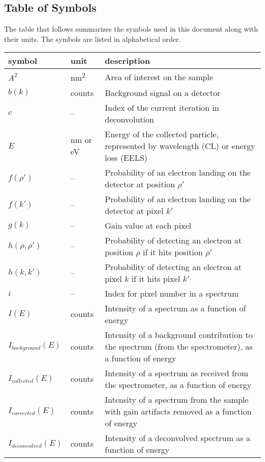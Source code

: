 \documentclass[12pt]{article}
\begin{document}
\subsection{Table of Symbols}

The table that follows summarizes the symbols used in this document along with
their units. The symbols are listed in alphabetical order.

\renewcommand{\arraystretch}{1.2}
\noindent \begin{longtable*}{l l p{12cm}} \toprule
\textbf{symbol} & \textbf{unit} & \textbf{description}\\
\midrule 
$A^2$ & \si{\nano\metre^2} & Area of interest on the sample\\
$b(k)$ & counts & Background signal on a detector\\
$c$ & -- & Index of the current iteration in deconvolution \\
$E$ & \si{\nano\metre} or \si{\electronvolt} & Energy of the collected particle, represented by wavelength (CL) or energy loss (EELS)\\
$f(\rho')$ & -- & Probability of an electron landing on the detector at position $\rho'$\\
$f(k')$ & -- & Probability of an electron landing on the detector at pixel $k'$\\
$g(k)$ & -- & Gain value at each pixel\\
$h(\rho, \rho')$ & -- & Probability of detecting an electron at position $\rho$ if it hits position $\rho'$\\
$h(k, k')$ & -- & Probability of detecting an electron at pixel $k$ if it hits pixel $k'$\\
$i$ & -- & Index for pixel number in a spectrum\\
$I(E)$ & counts & Intensity of a spectrum as a function of energy\\
$I_{background}(E)$ & counts & Intensity of a background contribution to the spectrum (from the spectrometer), as a function of energy\\
$I_{collected}(E)$ & counts & Intensity of a spectrum as received from the spectrometer, as a function of energy\\
$I_{corrected}(E)$ & counts & Intensity of a spectrum from the sample with gain artifacts removed as a function of energy\\
$I_{deconvolved}(E)$ & counts & Intensity of a deconvolved spectrum as a function of energy\\

\end{longtable*}
\end{document}
